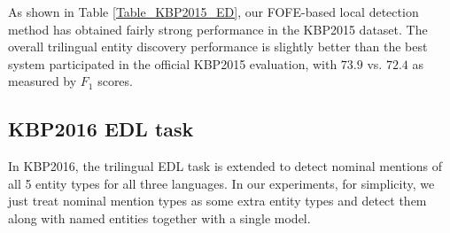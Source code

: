 \documentclass[11pt,a4paper]{article}
\begin{document}
As shown in Table \ref{Table_KBP2015_ED}, our FOFE-based local detection method has obtained fairly strong performance in the KBP2015 dataset. The overall trilingual entity discovery performance is slightly better than the best system participated in the official KBP2015 evaluation, with $73.9$ vs. $72.4$ as measured by $F_1$ scores.


\subsection{KBP2016 EDL task}

\begin{table}[t]
	\caption{Official entity discovery performance of our methods on KBP2016 trilingual EDL track.}
	\label{tbl:kbp2016}
\end{table}

In KBP2016, the trilingual EDL task is extended to detect nominal mentions of all 5 entity types for all three languages. In our experiments, for simplicity, we just treat nominal mention types as some extra entity types and detect them along with named entities together with a single model.  
\end{document}
